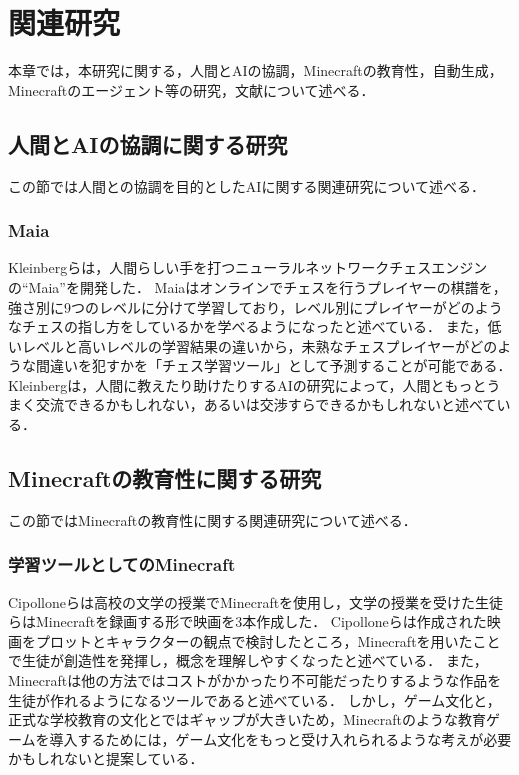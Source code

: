 \chapter{関連研究}	
\thispagestyle{plain}   %

本章では，本研究に関する，人間とAIの協調，Minecraftの教育性，自動生成，Minecraftのエージェント等の研究，文献について述べる．

\section{人間とAIの協調に関する研究}
この節では人間との協調を目的としたAIに関する関連研究について述べる．

\subsection{Maia}
Kleinbergらは，人間らしい手を打つニューラルネットワークチェスエンジンの“Maia”を開発した\cite{bib:maia}．
Maiaはオンラインでチェスを行うプレイヤーの棋譜を，強さ別に9つのレベルに分けて学習しており，レベル別にプレイヤーがどのようなチェスの指し方をしているかを学べるようになったと述べている．
また，低いレベルと高いレベルの学習結果の違いから，未熟なチェスプレイヤーがどのような間違いを犯すかを「チェス学習ツール」として予測することが可能である．
Kleinbergは，人間に教えたり助けたりするAIの研究によって，人間ともっとうまく交流できるかもしれない，あるいは交渉すらできるかもしれないと述べている．


\section{Minecraftの教育性に関する研究}
この節ではMinecraftの教育性に関する関連研究について述べる．

\subsection{学習ツールとしてのMinecraft}
Cipolloneらは高校の文学の授業でMinecraftを使用し，文学の授業を受けた生徒らはMinecraftを録画する形で映画を3本作成した\cite{bib:minecraft_creative tool}．
Cipolloneらは作成された映画をプロットとキャラクターの観点で検討したところ，Minecraftを用いたことで生徒が創造性を発揮し，概念を理解しやすくなったと述べている．
また，Minecraftは他の方法ではコストがかかったり不可能だったりするような作品を生徒が作れるようになるツールであると述べている．
しかし，ゲーム文化と，正式な学校教育の文化とではギャップが大きいため，Minecraftのような教育ゲームを導入するためには，ゲーム文化をもっと受け入れられるような考えが必要かもしれないと提案している．


